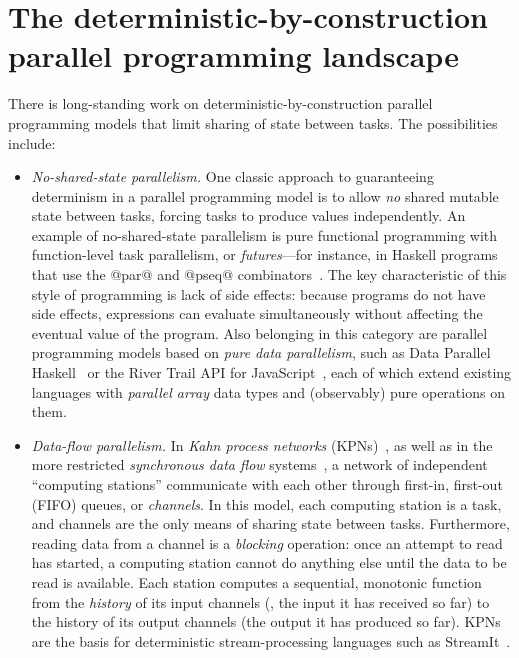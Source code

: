 \section{The deterministic-by-construction parallel programming landscape}\label{s:intro-landscape}

There is long-standing work on deterministic-by-construction parallel
programming models that limit sharing of state between tasks. The
possibilities include:

\begin{itemize}
\item \emph{No-shared-state parallelism.}  One classic approach to
  guaranteeing determinism in a parallel programming model is to allow
  \emph{no} shared mutable state between tasks, forcing tasks to
  produce values independently.  An example of no-shared-state
  parallelism is pure functional programming with function-level task
  parallelism, or \emph{futures}---for instance, in Haskell programs
  that use the @par@ and @pseq@ combinators~\cite{marlow-par}.  The
  key characteristic of this style of programming is lack of side
  effects: because programs do not have side effects, expressions can
  evaluate simultaneously without affecting the eventual value of the
  program.  Also belonging in this category are parallel programming
  models based on \emph{pure data parallelism}, such as Data Parallel
  Haskell~\cite{dph, dph-status} or the River Trail API for
  JavaScript~\cite{river-trail}, each of which extend existing
  languages with \emph{parallel array} data types and (observably)
  pure operations on them.

\item \emph{Data-flow parallelism.}  In \emph{Kahn process networks}
  (KPNs)~\cite{Kahn-1974}, as well as in the more restricted
  \emph{synchronous data flow} systems~\cite{Lee-sdn}, a network of
  independent ``computing stations'' communicate with each other
  through first-in, first-out (FIFO) queues, or \emph{channels}.  In
  this model, each computing station is a task, and channels are the
  only means of sharing state between tasks.  Furthermore, reading
  data from a channel is a \emph{blocking} operation: once an
  attempt to read has started, a computing station cannot do anything
  else until the data to be read is available.  Each station computes
  a sequential, monotonic function from the \emph{history} of its
  input channels (\ie, the input it has received so far) to the
  history of its output channels (the output it has produced so far).
  KPNs are the basis for deterministic stream-processing languages
  such as StreamIt~\cite{streamit-asplos}.


\end{itemize}
